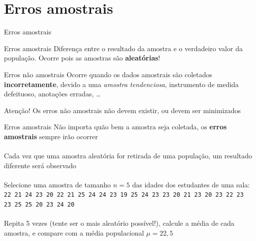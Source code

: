 \documentclass[10pt]{beamer}\usepackage[]{graphicx}\usepackage[]{color}
\theoremstyle{definition}
\begin{document}
\section{Erros amostrais}

\begin{frame}{Erros amostrais}
  \begin{block}{Erros amostrais}
    Diferença entre o resultado da amostra e o verdadeiro valor da
    população. Ocorre pois as amostras são \textbf{aleatórias}!
  \end{block}
  \vspace{1em}
  \begin{block}{Erros não amostrais}
    Ocorre quando os dados amostrais são coletados
    \textbf{incorretamente}, devido a uma \textsl{amostra tendenciosa},
    instrumento de medida defeituoso, anotações erradas, \ldots
  \end{block}
  \pause
  \begin{alertblock}{Atenção!}
    Os erros não amostrais não devem existir, ou devem ser minimizados
  \end{alertblock}
\end{frame}

\begin{frame}{Erros amostrais}
  Não importa quão bem a amostra seja coletada, os \textbf{erros
    amostrais} sempre irão ocorrer\\~\\
  Cada vez que uma amostra aleatória for retirada de uma população, um
  resultado diferente será observado\\~\\
  Selecione uma amostra de tamanho $n = 5$ das idades dos estudantes de
  uma sala: \texttt{22 21 24 23 20 22 21 25 24 24 23 19
    25 24 23 23 20 21 23 20 23
    22 23 23 25 25 20 23 24 20}\\~\\
  Repita 5 vezes (tente ser o mais aleatório possível!), calcule a média
  de cada amostra, e compare com a média populacional $\mu = 22,5$
\end{frame}
\end{document}

